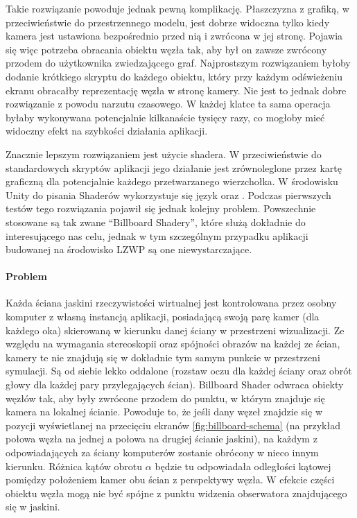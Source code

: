 
Takie rozwiązanie powoduje jednak pewną komplikację. Płaszczyzna z grafiką, w przeciwieństwie do przestrzennego modelu, jest dobrze widoczna tylko kiedy kamera jest ustawiona bezpośrednio przed nią i zwrócona w jej stronę. Pojawia się więc potrzeba obracania obiektu węzła tak, aby był on zawsze zwrócony przodem do użytkownika zwiedzającego graf. Najprostszym rozwiązaniem byłoby dodanie krótkiego skryptu do każdego obiektu, który przy każdym odświeżeniu ekranu obracałby reprezentację węzła w stronę kamery. Nie jest to jednak dobre rozwiązanie z powodu narzutu czasowego. W każdej klatce ta sama operacja byłaby wykonywana potencjalnie kilkanaście tysięcy razy, co mogłoby mieć widoczny efekt na szybkości działania aplikacji.

Znacznie lepszym rozwiązaniem jest użycie shadera. W przeciwieństwie do standardowych skryptów aplikacji jego działanie jest zrównoleglone przez kartę graficzną dla potencjalnie każdego przetwarzanego wierzchołka. W środowisku Unity do pisania Shaderów wykorzystuje się język  oraz  \cite{UnityShaders}. Podczas pierwszych testów tego rozwiązania pojawił się jednak kolejny problem. Powszechnie stosowane są tak zwane ``Billboard Shadery'', które służą dokładnie do interesującego nas celu, jednak w tym szczególnym przypadku aplikacji budowanej na środowisko LZWP są one niewystarczające. 

\paragraph{Problem} Każda ściana jaskini rzeczywistości wirtualnej jest kontrolowana przez osobny komputer z własną instancją aplikacji, posiadającą swoją parę kamer (dla każdego oka) skierowaną w kierunku danej ściany w przestrzeni wizualizacji. Ze względu na wymagania stereoskopii oraz spójności obrazów na każdej ze ścian, kamery te nie znajdują się w dokładnie tym samym punkcie w przestrzeni symulacji. Są od siebie lekko oddalone (rozstaw oczu dla każdej ściany oraz obrót głowy dla każdej pary przylegających ścian). Billboard Shader odwraca obiekty węzłów tak, aby były zwrócone przodem do punktu, w którym znajduje się kamera na lokalnej ścianie. Powoduje to, że jeśli dany węzeł znajdzie się w pozycji wyświetlanej na przecięciu ekranów \ref{fig:billboard-schema} (na przykład połowa węzła na jednej a połowa na drugiej ścianie jaskini), na każdym z odpowiadających za ściany komputerów zostanie obrócony w nieco innym kierunku. Różnica kątów obrotu \(\alpha\) będzie tu odpowiadała odległości kątowej pomiędzy położeniem kamer obu ścian z perspektywy węzła. W efekcie części obiektu węzła mogą nie być spójne z punktu widzenia obserwatora znajdującego się w jaskini.

